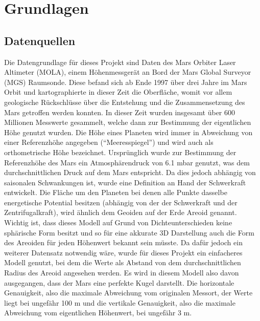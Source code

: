 \chapter{Grundlagen}

\section{Datenquellen}
Die Datengrundlage für dieses Projekt sind Daten des Mars Orbiter Laser Altimeter (MOLA), einem Höhenmessgerät an Bord der Mars Global Surveyor (MGS) Raumsonde. Diese befand sich ab Ende 1997 über drei Jahre im Mars Orbit und kartographierte in dieser Zeit die Oberfläche, womit vor allem geologische Rückschlüsse über die Entstehung und die Zusammensetzung des Mars getroffen werden konnten. In dieser Zeit wurden insgesamt über 600 Millionen Messwerte gesammelt, welche dann zur Bestimmung der eigentlichen Höhe genutzt wurden. Die Höhe eines Planeten wird immer in Abweichung von einer Referenzhöhe angegeben (“Meeresspiegel”) und wird auch als orthometrische Höhe bezeichnet. Ursprünglich wurde zur Bestimmung der Referenzhöhe des Mars ein Atmosphärendruck von 6.1 mbar genutzt, was dem durchschnittlichen Druck auf dem Mars entspricht. Da dies jedoch abhängig von saisonalen Schwankungen ist, wurde eine Definition an Hand der Schwerkraft entwickelt. Die Fläche um den Planeten bei denen alle Punkte dasselbe energetische Potential besitzen (abhängig von der der Schwerkraft und der Zentrifugalkraft), wird ähnlich dem Geoiden auf der Erde Areoid genannt. Wichtig ist, dass dieses Modell auf Grund von Dichteunterschieden keine sphärische Form besitzt und so für eine akkurate 3D Darstellung auch die Form des Areoiden für jeden Höhenwert bekannt sein müsste. Da dafür jedoch ein weiterer Datensatz notwendig wäre, wurde für dieses Projekt ein einfacheres Modell genutzt, bei dem die Werte als Abstand von dem durchschnittlichen Radius des Areoid angesehen werden. Es wird in diesem Modell also davon ausgegangen, dass der Mars eine perfekte Kugel darstellt. Die horizontale Genauigkeit, also die maximale Abweichung vom originalen Messort, der Werte liegt bei ungefähr 100 m und die vertikale Genauigkeit, also die maximale Abweichung vom eigentlichen Höhenwert, bei ungefähr 3 m. 

